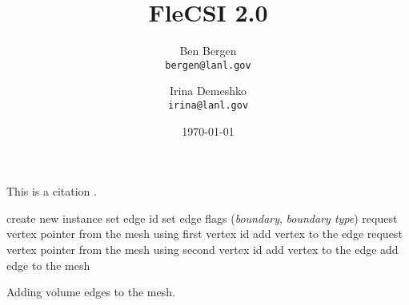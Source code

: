 \documentclass{article}
\title{FleCSI 2.0}
\author{
  Ben Bergen\\
  \texttt{bergen@lanl.gov}
  \and
  Irina Demeshko\\
  \texttt{irina@lanl.gov}
}
\date{\today}
\begin{document}
\maketitle




This is a citation \cite{LegionSC12}.





\begin{algorithm}
  \begin{algorithmic}[1]
    \STATE create new instance
    \STATE set edge id
    \STATE set edge flags (\emph{boundary}, \emph{boundary type})
    \STATE request vertex pointer from the mesh using first vertex id
    \STATE add vertex to the edge
    \STATE request vertex pointer from the mesh using second vertex id
    \STATE add vertex to the edge
    \STATE add edge to the mesh
    \ENDFOR
  \end{algorithmic}
  \caption{Adding volume edges to the mesh.}
  \label{algo:volume_edge_assembly}
\end{algorithm}



\end{document}

